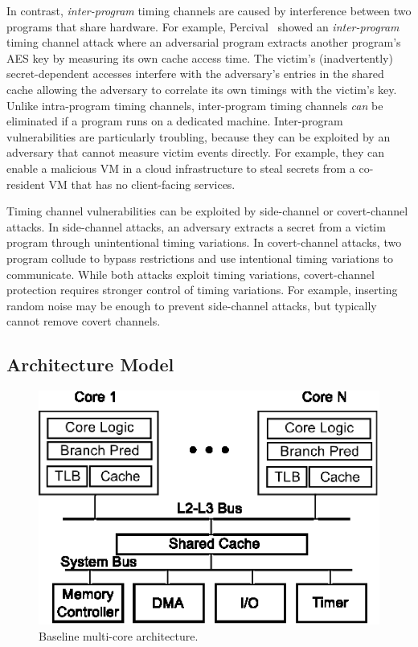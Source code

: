 In contrast, {\em inter-program} timing channels are caused by interference 
between two programs that share hardware.
For example, Percival~\cite{percival} showed an {\em inter-program} timing 
channel attack where an adversarial program extracts another program's AES key
by measuring its own cache access time. The victim's (inadvertently)
secret-dependent accesses interfere with the adversary's entries in the shared
cache allowing the adversary to correlate its own timings with the victim's key. 
Unlike intra-program timing channels, inter-program timing channels {\em can} be
eliminated if a program runs on a dedicated machine. Inter-program 
vulnerabilities are particularly troubling, because they can be exploited by an 
adversary that cannot measure victim events directly. For example, they can 
enable a malicious VM in a cloud infrastructure to steal secrets from a
co-resident VM that has no client-facing services.~\cite{heyyou}

Timing channel vulnerabilities can be exploited by side-channel or 
covert-channel attacks. In side-channel attacks, an adversary extracts a secret from
a victim program through unintentional timing variations.
In covert-channel attacks, two program collude to bypass restrictions and use
intentional timing variations to communicate.
While both attacks exploit timing variations, covert-channel protection requires
stronger control of timing variations. For example, inserting random noise may be
enough to prevent side-channel attacks, but typically cannot remove covert channels.

\subsection{Architecture Model}


    \begin{figure}
        \begin{center}
            \includegraphics{figs/baseline.eps}
            \caption{Baseline multi-core architecture.}
            \label{fig:baseline}
            \vspace{-0.2in}
        \end{center}
    \end{figure}

